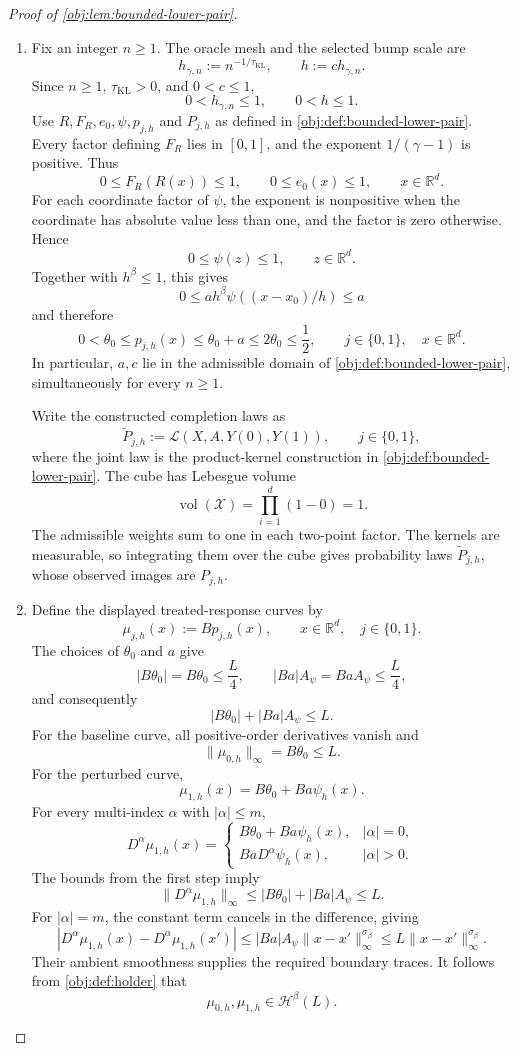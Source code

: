 \begin{proof}[Proof of \cref{obj:lem:bounded-lower-pair}]
\begin{enumerate}
\item Fix an integer \(n\ge1\). The oracle mesh and the selected bump scale are
\[
h_{\gamma,n}:=n^{-1/\tau_{\mathrm{KL}}},
\qquad
h:=ch_{\gamma,n}.
\]
Since \(n\ge1\), \(\tau_{\mathrm{KL}}>0\), and \(0<c\le1\),
\[
0<h_{\gamma,n}\le1,
\qquad
0<h\le1.
\]
Use \(R,F_R,e_0,\psi,p_{j,h}\) and \(P_{j,h}\) as defined in
\cref{obj:def:bounded-lower-pair}. Every factor defining \(F_R\) lies in
\([0,1]\), and the exponent \(1/(\gamma-1)\) is positive. Thus
\[
0\le F_R(R(x))\le1,
\qquad
0\le e_0(x)\le1,
\qquad x\in\mathbb R^d.
\]
For each coordinate factor of \(\psi\), the exponent is nonpositive when
the coordinate has absolute value less than one, and the factor is zero
otherwise. Hence
\[
0\le\psi(z)\le1,
\qquad z\in\mathbb R^d.
\]
Together with \(h^\beta\le1\), this gives
\[
0\le ah^\beta\psi((x-x_0)/h)\le a
\]
and therefore
\[
0<\theta_0\le p_{j,h}(x)
\le\theta_0+a
\le2\theta_0
\le\frac12,
\qquad j\in\{0,1\},\quad x\in\mathbb R^d.
\]
In particular, \(a,c\) lie in the admissible domain of
\cref{obj:def:bounded-lower-pair}, simultaneously for every \(n\ge1\).

Write the constructed completion laws as
\[
\widetilde P_{j,h}:=
\mathcal L(X,A,Y(0),Y(1)),
\qquad j\in\{0,1\},
\]
where the joint law is the product-kernel construction in
\cref{obj:def:bounded-lower-pair}. The cube has Lebesgue volume
\[
\operatorname{vol}(\mathcal X)=\prod_{i=1}^{d}(1-0)=1.
\]
The admissible weights sum to one in each two-point factor. The kernels
are measurable, so integrating them over the cube gives probability
laws \(\widetilde P_{j,h}\), whose observed images are \(P_{j,h}\).

\item Define the displayed treated-response curves by
\[
\mu_{j,h}(x):=Bp_{j,h}(x),
\qquad x\in\mathbb R^d,\quad j\in\{0,1\}.
\]
The choices of \(\theta_0\) and \(a\) give
\[
|B\theta_0|=B\theta_0\le\frac L4,
\qquad
|Ba|A_\psi=BaA_\psi\le\frac L4,
\]
and consequently
\[
|B\theta_0|+|Ba|A_\psi\le L.
\]
For the baseline curve, all positive-order derivatives vanish and
\[
\|\mu_{0,h}\|_\infty=B\theta_0\le L.
\]
For the perturbed curve,
\[
\mu_{1,h}(x)=B\theta_0+Ba\psi_h(x).
\]
For every multi-index \(\alpha\) with \(|\alpha|\le m\),
\[
D^\alpha\mu_{1,h}(x)
=
\begin{cases}
B\theta_0+Ba\psi_h(x),&|\alpha|=0,\\
BaD^\alpha\psi_h(x),&|\alpha|>0.
\end{cases}
\]
The bounds from the first step imply
\[
\|D^\alpha\mu_{1,h}\|_\infty
\le |B\theta_0|+|Ba|A_\psi
\le L.
\]
For \(|\alpha|=m\), the constant term cancels in the difference, giving
\[
|D^\alpha\mu_{1,h}(x)-D^\alpha\mu_{1,h}(x')|
\le |Ba|A_\psi\|x-x'\|_\infty^{\sigma_\beta}
\le L\|x-x'\|_\infty^{\sigma_\beta}.
\]
Their ambient smoothness supplies the required boundary traces.
It follows from \cref{obj:def:holder} that
\[
\mu_{0,h},\mu_{1,h}\in\mathcal H^\beta(L).
\]


\end{enumerate}
\end{proof}
